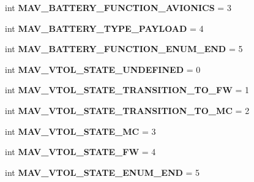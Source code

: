\begin{DoxyCompactItemize}
int {\bfseries M\+A\+V\+\_\+\+B\+A\+T\+T\+E\+R\+Y\+\_\+\+F\+U\+N\+C\+T\+I\+O\+N\+\_\+\+A\+V\+I\+O\+N\+I\+CS} = 3
\item 
\mbox{\label{namespacepymavlink_1_1dialects_1_1v10_afc38fe4934809a5442559d323f930303}} 
int {\bfseries M\+A\+V\+\_\+\+B\+A\+T\+T\+E\+R\+Y\+\_\+\+T\+Y\+P\+E\+\_\+\+P\+A\+Y\+L\+O\+AD} = 4
\item 
\mbox{\label{namespacepymavlink_1_1dialects_1_1v10_af8a01dba3f3e4bc5ae72b63c6f2f0042}} 
int {\bfseries M\+A\+V\+\_\+\+B\+A\+T\+T\+E\+R\+Y\+\_\+\+F\+U\+N\+C\+T\+I\+O\+N\+\_\+\+E\+N\+U\+M\+\_\+\+E\+ND} = 5
\item 
\mbox{\label{namespacepymavlink_1_1dialects_1_1v10_a83d22f8f79ed07134215694ddd13b083}} 
int {\bfseries M\+A\+V\+\_\+\+V\+T\+O\+L\+\_\+\+S\+T\+A\+T\+E\+\_\+\+U\+N\+D\+E\+F\+I\+N\+ED} = 0
\item 
\mbox{\label{namespacepymavlink_1_1dialects_1_1v10_ae13d497b4c594738b75d301c902d5821}} 
int {\bfseries M\+A\+V\+\_\+\+V\+T\+O\+L\+\_\+\+S\+T\+A\+T\+E\+\_\+\+T\+R\+A\+N\+S\+I\+T\+I\+O\+N\+\_\+\+T\+O\+\_\+\+FW} = 1
\item 
\mbox{\label{namespacepymavlink_1_1dialects_1_1v10_aec5eb035661c7d9bf7cc7143615db36e}} 
int {\bfseries M\+A\+V\+\_\+\+V\+T\+O\+L\+\_\+\+S\+T\+A\+T\+E\+\_\+\+T\+R\+A\+N\+S\+I\+T\+I\+O\+N\+\_\+\+T\+O\+\_\+\+MC} = 2
\item 
\mbox{\label{namespacepymavlink_1_1dialects_1_1v10_a6a330bad1d2cbc70aed8f4a8471b8367}} 
int {\bfseries M\+A\+V\+\_\+\+V\+T\+O\+L\+\_\+\+S\+T\+A\+T\+E\+\_\+\+MC} = 3
\item 
\mbox{\label{namespacepymavlink_1_1dialects_1_1v10_a2b7c9d84e1d3e573ea5274cb4cd25b1e}} 
int {\bfseries M\+A\+V\+\_\+\+V\+T\+O\+L\+\_\+\+S\+T\+A\+T\+E\+\_\+\+FW} = 4
\item 
\mbox{\label{namespacepymavlink_1_1dialects_1_1v10_a37dbfab70b5b4897b283debe9b3c8cee}} 
int {\bfseries M\+A\+V\+\_\+\+V\+T\+O\+L\+\_\+\+S\+T\+A\+T\+E\+\_\+\+E\+N\+U\+M\+\_\+\+E\+ND} = 5

\end{DoxyCompactItemize}
